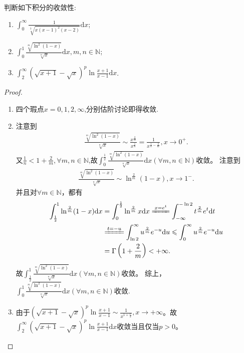 \documentclass[../../main.tex]{subfiles}%
\begin{document}
\begin{example}
判断如下积分的收敛性:
\begin{enumerate}
\item  \(\int_{0}^{\infty}\frac{1}{\sqrt[3]{x(x - 1)^2(x - 2)}}\mathrm{d}x\);

\item \(\int_{0}^{1}\frac{\sqrt[m]{\ln^2(1 - x)}}{\sqrt[n]{x}}\mathrm{d}x, m,n\in\mathbb{N}\);

\item \(\int_{2}^{\infty}(\sqrt{x + 1}-\sqrt{x})^p\ln\frac{x + 1}{x - 1}\mathrm{d}x\).
\end{enumerate}
\end{example}
\begin{proof}
\begin{enumerate}
\item 四个瑕点$x=0,1,2,\infty$,分别估阶讨论即得收敛.

\item 注意到
\begin{align*}
\frac{\sqrt[m]{\ln ^2(1 - x)}}{\sqrt[n]{x}}\sim\frac{x^{\frac{2}{m}}}{x^{\frac{1}{n}}}=\frac{1}{x^{\frac{1}{n}-\frac{2}{m}}},x\rightarrow 0^+.
\end{align*}
又\(\frac{1}{n}<1+\frac{2}{m},\forall m,n\in \mathbb{N}\),故\(\int_{0}^{\frac{1}{2}}\frac{\sqrt[m]{\ln ^2(1 - x)}}{\sqrt[n]{x}}\mathrm{d}x\left( \forall m,n\in \mathbb{N} \right)\)收敛。
注意到
\begin{align*}
\frac{\sqrt[m]{\ln ^2(1 - x)}}{\sqrt[n]{x}}\sim\ln ^{\frac{2}{m}}(1 - x),x\rightarrow 1^-.
\end{align*}
并且对\(\forall m\in \mathbb{N}\)，都有
\begin{align*}
\int_{\frac{1}{2}}^1{\ln ^{\frac{2}{m}}(1}-x)\mathrm{d}x&=\int_0^{\frac{1}{2}}{\ln ^{\frac{2}{m}}x\mathrm{d}x\xlongequal{x=e^t}\int_{-\infty}^{-\ln 2}{t^{\frac{2}{m}}e^t\mathrm{d}t}}
\\
&\xlongequal{t=-u}\int_{\ln 2}^{\infty}{u^{\frac{2}{m}}e^{-u}\mathrm{d}u}\leqslant \int_0^{\infty}{u^{\frac{2}{m}}e^{-u}\mathrm{d}u}
\\
&=\Gamma \left( 1+\frac{2}{m} \right) <+\infty .
\end{align*}
故\(\int_{\frac{1}{2}}^{1}\frac{\sqrt[m]{\ln ^2(1 - x)}}{\sqrt[n]{x}}\mathrm{d}x\left( \forall m,n\in \mathbb{N} \right)\)收敛。
综上，\(\int_{0}^{1}\frac{\sqrt[m]{\ln ^2(1 - x)}}{\sqrt[n]{x}}\mathrm{d}x\left( \forall m,n\in \mathbb{N} \right)\)收敛.

\item 由于\((\sqrt{x + 1} - \sqrt{x})^p\ln\frac{x + 1}{x - 1}\sim\frac{1}{x^{1+\frac{p}{2}}},x\rightarrow +\infty\)。故\(\int_{2}^{\infty}(\sqrt{x + 1} - \sqrt{x})^p\ln\frac{x + 1}{x - 1} \mathrm{d}x\)收敛当且仅当\(p > 0\)。 
\end{enumerate}

\end{proof}
\end{document}
